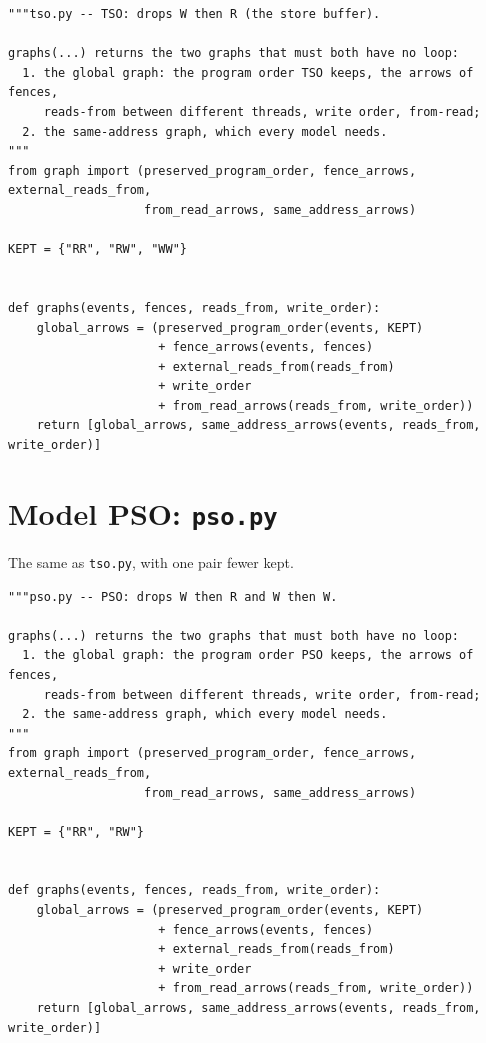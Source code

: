 \begin{lstlisting}[style=vspython]
"""tso.py -- TSO: drops W then R (the store buffer).

graphs(...) returns the two graphs that must both have no loop:
  1. the global graph: the program order TSO keeps, the arrows of fences,
     reads-from between different threads, write order, from-read;
  2. the same-address graph, which every model needs.
"""
from graph import (preserved_program_order, fence_arrows, external_reads_from,
                   from_read_arrows, same_address_arrows)

KEPT = {"RR", "RW", "WW"}


def graphs(events, fences, reads_from, write_order):
    global_arrows = (preserved_program_order(events, KEPT)
                     + fence_arrows(events, fences)
                     + external_reads_from(reads_from)
                     + write_order
                     + from_read_arrows(reads_from, write_order))
    return [global_arrows, same_address_arrows(events, reads_from, write_order)]
\end{lstlisting}

\section{Model PSO: \texttt{pso.py}}
The same as \texttt{tso.py}, with one pair fewer kept.

\begin{lstlisting}[style=vspython]
"""pso.py -- PSO: drops W then R and W then W.

graphs(...) returns the two graphs that must both have no loop:
  1. the global graph: the program order PSO keeps, the arrows of fences,
     reads-from between different threads, write order, from-read;
  2. the same-address graph, which every model needs.
"""
from graph import (preserved_program_order, fence_arrows, external_reads_from,
                   from_read_arrows, same_address_arrows)

KEPT = {"RR", "RW"}


def graphs(events, fences, reads_from, write_order):
    global_arrows = (preserved_program_order(events, KEPT)
                     + fence_arrows(events, fences)
                     + external_reads_from(reads_from)
                     + write_order
                     + from_read_arrows(reads_from, write_order))
    return [global_arrows, same_address_arrows(events, reads_from, write_order)]
\end{lstlisting}

